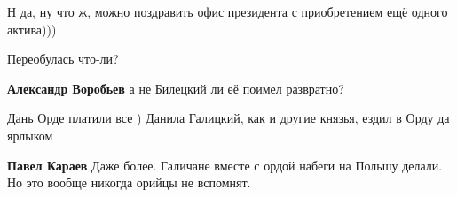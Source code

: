 \begin{itemize}
 
Н да, ну что ж, можно поздравить офис президента с приобретением ещё одного актива)))

 
Переобулась что-ли?

\begin{itemize}
 
\textbf{Александр Воробьев} а не Билецкий ли её поимел развратно?
\end{itemize}

 
Дань Орде платили все )
Данила Галицкий, как и другие князья, ездил в Орду да ярлыком

\begin{itemize}
 
\textbf{Павел Караев} Даже более. Галичане вместе с ордой набеги на Польшу делали. Но это вообще никогда орийцы не вспомнят.
\end{itemize}

\end{itemize}

